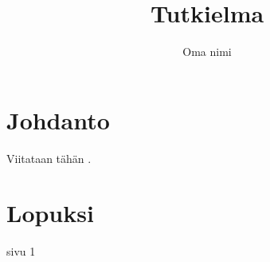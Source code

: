 \documentclass[a4paper,12pt,language=finnish]{utuftthesis}
\title{Tutkielma}
\author{Oma nimi}
\begin{document}
\maketitle
\begin{abstract}\blindtext\end{abstract}

\tableofcontents

\chapter{Johdanto}
\blindtext
Viitataan tähän \cite{crawley2007write}.

\chapter{Lopuksi}
\blindtext

\printbibliography

sivu 1
\end{document}
